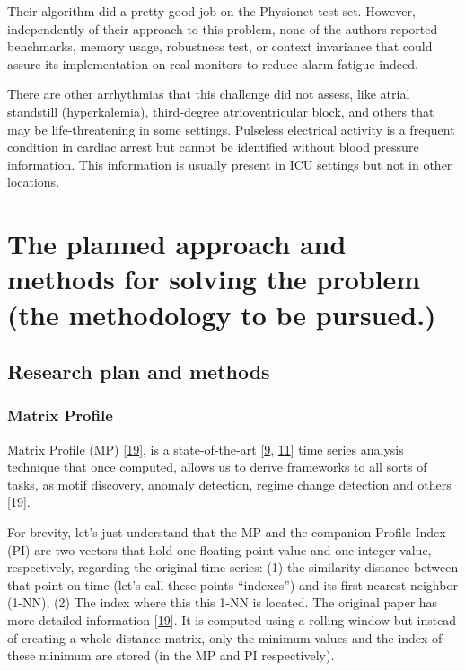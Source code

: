 \documentclass[runningheads]{llncs}
\begin{document}
Their algorithm did a pretty good job on the Physionet test set. However, independently of their approach to this
problem, none of the authors reported benchmarks, memory usage, robustness test, or context invariance that could assure
its implementation on real monitors to reduce alarm fatigue indeed.

There are other arrhythmias that this challenge did not assess, like atrial standstill (hyperkalemia), third-degree
atrioventricular block, and others that may be life-threatening in some settings. Pulseless electrical activity is a
frequent condition in cardiac arrest but cannot be identified without blood pressure information. This information is
usually present in ICU settings but not in other locations.

\hypertarget{the-planned-approach-and-methods-for-solving-the-problem-the-methodology-to-be-pursued.}{%
\section{The planned approach and methods for solving the problem (the methodology to be pursued.)}\label{the-planned-approach-and-methods-for-solving-the-problem-the-methodology-to-be-pursued.}}

\hypertarget{research-plan-and-methods}{%
\subsection{Research plan and methods}\label{research-plan-and-methods}}

\hypertarget{matrixprofile}{%
\subsubsection{Matrix Profile}\label{matrixprofile}}

Matrix Profile (MP) {[}\protect\hyperlink{ref-Yeh2017a}{19}{]}, is a state-of-the-art {[}\protect\hyperlink{ref-DePaepe2020}{9}, \protect\hyperlink{ref-Feremans2020}{11}{]} time series
analysis technique that once computed, allows us to derive frameworks to all sorts of tasks, as
motif discovery, anomaly detection, regime change detection and others {[}\protect\hyperlink{ref-Yeh2017a}{19}{]}.

For brevity, let's just understand that the MP and the companion Profile Index (PI) are two vectors
that hold one floating point value and one integer value, respectively, regarding the original time
series: (1) the similarity distance between that point on time (let's call these points ``indexes'')
and its first nearest-neighbor (1-NN), (2) The index where this this 1-NN is located. The original
paper has more detailed information {[}\protect\hyperlink{ref-Yeh2017a}{19}{]}. It is computed using a rolling window but instead
of creating a whole distance matrix, only the minimum values and the index of these minimum are
stored (in the MP and PI respectively).
\end{document}
